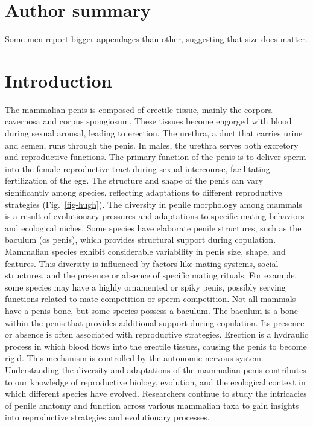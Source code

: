 \documentclass[
  10pt,
  letterpaper,
]{article}
\begin{document}
\section*{Author summary}
Some men report bigger appendages than other, suggesting that size does
matter.

\linenumbers\hypertarget{introduction}{%
\section{Introduction}\label{introduction}}

The mammalian penis \citep{King2020} is composed of erectile tissue,
mainly the corpora cavernosa and corpus spongiosum. These tissues become
engorged with blood during sexual arousal, leading to erection. The
urethra, a duct that carries urine and semen, runs through the penis. In
males, the urethra serves both excretory and reproductive functions. The
primary function of the penis is to deliver sperm into the female
reproductive tract during sexual intercourse, facilitating fertilization
of the egg. The structure and shape of the penis can vary significantly
among species, reflecting adaptations to different reproductive
strategies (Fig.~\ref{fig-hugh}). The diversity in penile morphology
among mammals is a result of evolutionary pressures and adaptations to
specific mating behaviors and ecological niches. Some species have
elaborate penile structures, such as the baculum (os penis), which
provides structural support during copulation. Mammalian species exhibit
considerable variability in penis size, shape, and features. This
diversity is influenced by factors like mating systems, social
structures, and the presence or absence of specific mating rituals. For
example, some species may have a highly ornamented or spiky penis,
possibly serving functions related to mate competition or sperm
competition. Not all mammals have a penis bone, but some species possess
a baculum. The baculum is a bone within the penis that provides
additional support during copulation. Its presence or absence is often
associated with reproductive strategies. Erection is a hydraulic process
in which blood flows into the erectile tissues, causing the penis to
become rigid. This mechanism is controlled by the autonomic nervous
system. Understanding the diversity and adaptations of the mammalian
penis contributes to our knowledge of reproductive biology, evolution,
and the ecological context in which different species have evolved.
Researchers continue to study the intricacies of penile anatomy and
function across various mammalian taxa to gain insights into
reproductive strategies and evolutionary processes.
\end{document}
